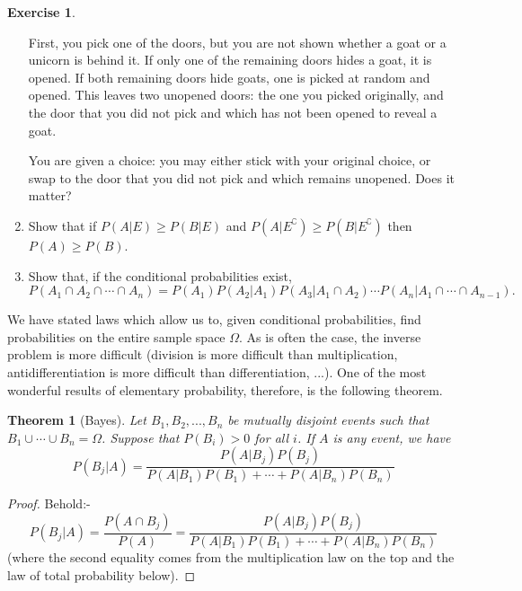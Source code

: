 \documentclass[a4paper,leqno]{article}
\numberwithin{equation}{section}
\newtheorem{thm}[equation]{Theorem}
\theoremstyle{definition}
\newtheorem{exercise}[equation]{Exercise}
\theoremstyle{remark}
\newcommand{\union}{\cup}
\newcommand{\inter}{\cap}
\begin{document}
\begin{exercise}
\begin{enumerate}
          First, you pick one of the doors, but you are not shown whether a goat or a unicorn is behind it. If only one of the remaining doors hides
          a goat, it is opened. If both remaining doors hide goats, one is picked at random and opened. This leaves two unopened doors: the one
          you picked originally, and the door that you did not pick and which has not been opened to reveal a goat.

          You are given a choice: you may either stick with your original choice, or swap to the door that you did not pick and which remains unopened.
          Does it matter?
    \item Show that if $ P(A | E) \geq P(B | E) $ and $ P(A | E^\complement) \geq P(B | E^\complement) $ then $ P(A) \geq P(B) $.
    \item Show that, if the conditional probabilities exist,
      \begin{displaymath}
        P(A_1 \inter A_2 \inter \cdots \inter A_n) = P(A_1) P(A_2 | A_1) P(A_3 | A_1 \inter A_2) \cdots P(A_n | A_1 \inter \cdots \inter A_{n-1}).
      \end{displaymath}
  \end{enumerate}
\end{exercise}

We have stated laws which allow us to, given conditional probabilities, find probabilities on the entire sample space $ \Omega $. As
is often the case, the inverse problem is more difficult (division is more difficult than multiplication, antidifferentiation is more difficult
than differentiation, ...). One of the most wonderful results of elementary probability, therefore, is the following theorem.

\begin{thm}[Bayes]
  Let $ B_1, B_2,...,B_n $ be mutually disjoint events such that $ B_1 \union \cdots \union B_n = \Omega $. Suppose that $ P(B_i) > 0 $
  for all $ i $. If $ A $ is any event, we have
  \begin{displaymath}
    P(B_j | A) = \frac{P(A | B_j) P(B_j)}{P(A | B_1) P(B_1) + \cdots + P(A | B_n) P(B_n)}
  \end{displaymath}
\end{thm}
\begin{proof}
  Behold:-
  \begin{displaymath}
    P(B_j | A) = \frac{P(A \inter B_j)}{P(A)} = \frac{P(A | B_j) P(B_j)}{P(A | B_1) P(B_1) + \cdots + P(A | B_n) P(B_n)}
  \end{displaymath}
  (where the second equality comes from the multiplication law on the top and the law of total probability below).
\end{proof}
\end{document}
